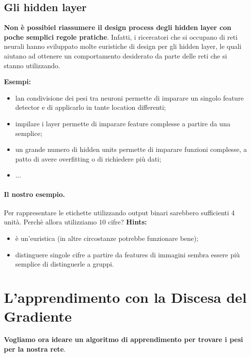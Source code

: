 \subsection{Gli hidden layer}
\textbf{Non è possibiel riassumere il design process degli hidden layer con poche semplici regole pratiche}. Infatti, i ricercatori che si occupano di reti neurali hanno sviluppato molte euristiche di design per gli hidden layer, le quali aiutano ad ottenere un comportamento desiderato da parte delle reti che si stanno utilizzando.


\textbf{Esempi:}
\begin{itemize}
    \item lan condivisione dei pesi tra neuroni permette di imparare un singolo feature detector e di applicarlo in tante location differenti;
    \item impilare i layer permette di imparare feature complesse a partire da una semplice;
    \item un grande numero di hidden units permette di imparare funzioni complesse, a patto di avere overfitting o di richiedere più dati;
    \item $\dots$
\end{itemize}

\paragraph{Il nostro esempio.} Per rappresentare le etichette utilizzando output binari sarebbero sufficienti 4 unità. Perchè allora utilizziamo $10$ cifre? \textbf{Hints:}
\begin{itemize}
    \item è un'euristica (in altre circostanze potrebbe funzionare bene);
    \item distinguere singole cifre a partire da features di immagini sembra essere più semplice di distinguerle a gruppi.
\end{itemize}
\newpage
\section{L'apprendimento con la Discesa del Gradiente}
\textbf{Vogliamo ora ideare un algoritmo di apprendimento per trovare i pesi per la nostra rete}.



